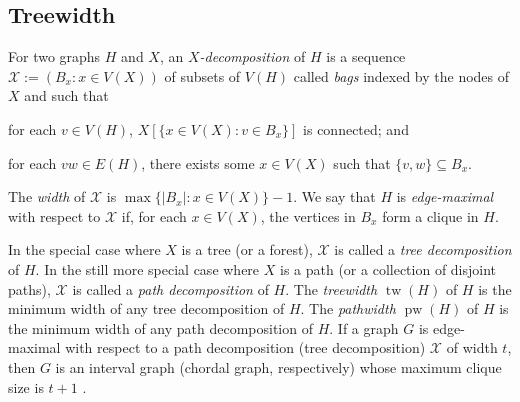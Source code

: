 \documentclass[kpfonts]{patmorin}
\DeclareMathOperator{\tw}{tw}
\DeclareMathOperator{\pw}{pw}
\theoremstyle{named}
\begin{document}



\subsection{Treewidth}

For two graphs $H$ and $X$, an \emph{$X$-decomposition} of $H$ is a sequence $\mathcal{X}:=(B_x:x\in V(X))$ of subsets of $V(H)$ called \emph{bags} indexed by the nodes of $X$ and such that
 \begin{inparaenum}[(i)]
     \item for each $v\in V(H)$, $X[\{x\in V(X):v\in B_x\}]$ is connected; and
     \item for each $vw\in E(H)$, there exists some $x\in V(X)$ such that $\{v,w\}\subseteq B_x$.
\end{inparaenum}
The \emph{width} of $\mathcal{X}$ is $\max\{|B_x|:x\in V(X)\}-1$. We say that $H$ is \emph{edge-maximal} with respect to $\mathcal{X}$ if, for each $x\in V(X)$, the vertices in $B_x$ form a clique in $H$.


In the special case where $X$ is a tree (or a forest), $\mathcal{X}$ is called a \emph{tree decomposition} of $H$.  In the still more special case where $X$ is a path (or a collection of disjoint paths), $\mathcal{X}$ is called a \emph{path decomposition} of $H$. The \emph{treewidth} $\tw(H)$ of $H$ is the minimum width of any tree decomposition of $H$. The \emph{pathwidth} $\pw(H)$ of $H$ is the minimum width of any path decomposition of $H$.  If a graph $G$ is edge-maximal with respect to a path decomposition (tree decomposition) $\mathcal{X}$ of width $t$, then $G$ is an interval graph (chordal graph, respectively) whose maximum clique size is $t+1$ \cite{bodlaender:partial}.
\end{document}
